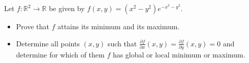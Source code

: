 Let \(f\colon \mathbb R ^2 \rightarrow \mathbb R\) be given by \(f(x,y)=(x^2-y^2)e^{-x^2-y^2}\).
\begin{itemize}

\item[(a)] Prove that \(f\) attains its minimum and its maximum.

\item[(b)] Determine all points \((x,y)\) such that \(\frac{\partial f}{\partial x}(x,y)=\frac{\partial f}{\partial y}(x,y)=0\) and determine for which of them \(f\) has global or local minimum or maximum.
\end{itemize}
